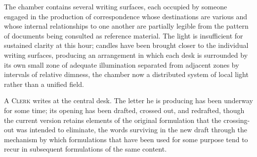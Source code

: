 \documentclass[12pt, oneside]{article}
\newenvironment{action}{%
  \vspace{0.6em}%
  \noindent\ignorespaces%
}{%
  \par\vspace{0.6em}%
}
\begin{document}
\begin{action}
The chamber contains several writing surfaces, each occupied by someone engaged in the production of correspondence whose destinations are various and whose internal relationships to one another are partially legible from the pattern of documents being consulted as reference material. The light is insufficient for sustained clarity at this hour; candles have been brought closer to the individual writing surfaces, producing an arrangement in which each desk is surrounded by its own small zone of adequate illumination separated from adjacent zones by intervals of relative dimness, the chamber now a distributed system of local light rather than a unified field.

A \textsc{Clerk} writes at the central desk. The letter he is producing has been underway for some time; its opening has been drafted, crossed out, and redrafted, though the current version retains elements of the original formulation that the crossing-out was intended to eliminate, the words surviving in the new draft through the mechanism by which formulations that have been used for some purpose tend to recur in subsequent formulations of the same content.
\end{action}
\end{document}
